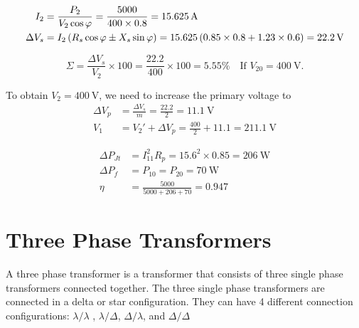 \documentclass{report}
\begin{document}
{\begin{enumerate}
		\ii
		\begin{align*}
			I_2        & = \frac{P_2}{V_2\cos\varphi} = \frac{5000}{400 \times 0.8} = \SI{15.625}{\ampere}                                           \\
			\Delta V_s & = I_2 \left( R_s \cos\varphi \pm X_s \sin\varphi \right) = 15.625 \left( 0.85 \times 0.8 + 1.23 \times 0.6 \right) = \SI{22.2}{\volt} \\
		\end{align*}

		\[
			\Sigma = \frac{\Delta V_s}{V_2} \times 100 = \frac{22.2}{400} \times 100 = 5.55\% \quad \text{If } V_{20} = \SI{400}{\volt}
			.\]

		To obtain $V_2=\SI{400}{\volt}$, we need to increase the primary voltage to
		\begin{align*}
			\Delta V_p & = \frac{\Delta V_s}{m} = \frac{22.2}{2} = \SI{11.1}{\volt}     \\
			V_1        & = V_2' + \Delta V_p = \frac{400}{2} + 11.1 = \SI{211.1}{\volt}
		\end{align*}

		\ii
		\begin{align*}
			\Delta P_{Jt} & = I_{11}^2R_p = 15.6^2 \times 0.85 = \SI{206}{\watt} \\
			\Delta P_f    & = P_{10} = P_{20} = \SI{70}{\watt}                   \\
			\eta          & = \frac{5000}{5000 + 206 + 70} = 0.947
		\end{align*}
	\end{enumerate}
}

\chapter{Three Phase Transformers}

A three phase transformer is a transformer that consists of three single phase transformers connected together. The three single phase transformers are connected in a delta or star configuration. They can have 4 different connection configurations: $\lambda/\lambda$ , $\lambda/\Delta$, $\Delta/\lambda$, and $\Delta/\Delta$
\end{document}
